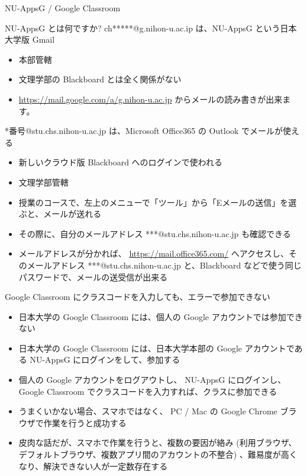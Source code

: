 \documentclass[a4j,10pt]{jsarticle}
\begin{document}
{\newpage\clearpage
{}%
\begin{frame}[label={sec:org25495ab},fragile]{NU-AppsG / Google Classroom}
\begin{block}{NU-AppsG とは何ですか?}
ch*****@g.nihon-u.ac.ip は、NU-AppsG という日本大学版 Gmail
\begin{itemize}
\item 本部管轄
\item 文理学部の Blackboard とは全く関係がない
\item \url{https://mail.google.com/a/g.nihon-u.ac.jp}
からメールの読み書きが出来ます。
\end{itemize}
\par
*番号@stu.chs.nihon-u.ac.jp は、Microsoft Office365 の Outlook でメールが使える
\begin{itemize}
\item 新しいクラウド版 Blackboard へのログインで使われる
\item 文理学部管轄
\item 授業のコースで、左上のメニューで「ツール」から「Eメールの送信」を選ぶと、メールが送れる
\item その際に、自分のメールアドレス ***@stu.chs.nihon-u.ac.jp も確認できる
\item メールアドレスが分かれば、
\url{https://mail.office365.com/}
へアクセスし、そのメールアドレス ***@stu.chs.nihon-u.ac.jp と、Blackboard などで使う同じパスワードで、メールの送受信が出来る
\end{itemize}
\end{block}
\par
\begin{block}{Google Classroom にクラスコードを入力しても、エラーで参加できない}
\begin{itemize}
\item 日本大学の Google Classroom には、個人の Google アカウントでは参加できない
\item 日本大学の Google Classroom には、日本大学本部の Google アカウントである NU-AppsG にログインをして、参加する
\item 個人の Google アカウントをログアウトし、 NU-AppsG にログインし、 Google Classroom でクラスコードを入力すれば、クラスに参加できる
\item うまくいかない場合、スマホではなく、 PC / Mac の Google Chrome ブラウザで作業を行うと成功する
\item 皮肉な話だが、スマホで作業を行うと、複数の要因が絡み (利用ブラウザ、デフォルトブラウザ、複数アプリ間のアカウントの不整合) 、難易度が高くなり、解決できない人が一定数存在する

\end{itemize}
\end{block}
\end{frame}}
\end{document}
